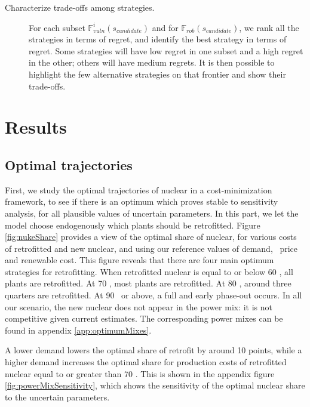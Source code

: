 \begin{description}
	\item [Characterize trade-offs among strategies.] For each subset $\mathbb{F}^i_{vuln}(s_{candidate})$ and for $\mathbb{F}_{rob}(s_{candidate})$, we rank all the strategies in terms of regret, and identify the best strategy in terms of regret.
	Some strategies will have low regret in one subset and a high regret in the other; others will have medium regrets. It is then possible to highlight the few alternative strategies on that frontier and show their trade-offs.
	
\end{description} 







\section{Results}
\label{sec:results}

\subsection{Optimal trajectories}
\label{ssec:optimaltraj}
First, we study the optimal trajectories of nuclear in a cost-minimization framework, to see if there is an optimum which proves stable to sensitivity analysis, for all plausible values of uncertain parameters. In this part, we let the model choose endogenously which plants should be retrofitted.
Figure \ref{fig:nukeShare} provides a view of the optimal share of nuclear, for various costs of retrofitted and new nuclear, and using our reference values of demand, \coo\ price and renewable cost. This figure reveals that there are four main optimum strategies for retrofitting. When retrofitted nuclear is equal to or below 60 \emwh, all plants are retrofitted. At 70 \emwh, most plants are retrofitted. At 80 \emwh, around three quarters are retrofitted. At 90 \emwh\ or above, a full and early phase-out occurs. In all our scenario, the new nuclear does not appear in the power mix: it is not competitive given current estimates. The corresponding power mixes can be found in appendix \ref{app:optimumMixes}.

A lower demand lowers the optimal share of retrofit by around 10 points, while a higher demand increases the optimal share for production costs of retrofitted nuclear equal to or greater than 70 \emwh. This is shown in the appendix figure \ref{fig:powerMixSensitivity}, which shows the sensitivity of the optimal nuclear share to the uncertain parameters. 

